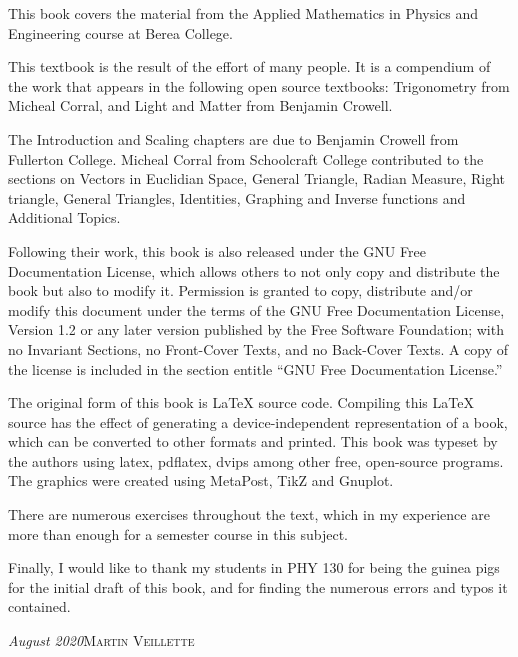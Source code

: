 This book covers the material from the Applied Mathematics in Physics and Engineering course at Berea College. 

This textbook is the result of the effort of many people. It is a compendium of the work that appears in the following open source textbooks: Trigonometry from Micheal Corral, and Light and Matter from Benjamin Crowell.

The Introduction and Scaling chapters are due to Benjamin Crowell from Fullerton College. Micheal Corral from Schoolcraft College contributed to the sections on Vectors in Euclidian Space, General Triangle, Radian Measure,
Right triangle, General Triangles, Identities, Graphing and Inverse functions and Additional Topics.  

Following their work, this book is also released under the GNU Free Documentation License, which allows others to not only copy and distribute the book but also to modify it. Permission is granted to copy, distribute and/or modify this document under the terms of the GNU Free Documentation License, Version 1.2 or any later version published by the Free Software Foundation; with no Invariant Sections, no Front-Cover Texts, and no Back-Cover Texts. A copy of the license is included in the section entitle ``GNU Free Documentation License.''

The original form of this book is LaTeX source code. Compiling this LaTeX source has the effect of generating a device-independent representation of a book, which can be converted to other formats and printed. This book was typeset by the authors using latex, pdflatex, dvips among other free, open-source programs. The graphics were created using MetaPost, TikZ and Gnuplot.

There are numerous exercises throughout the text, which in my experience are more than enough for a semester course in this subject.

Finally, I would like to thank my students in PHY 130 for being the guinea pigs for the initial draft of this book, and for finding the numerous errors and typos it contained.

\begin{flushleft}
\emph{August 2020}\textsc{Martin Veillette}
\end{flushleft}

